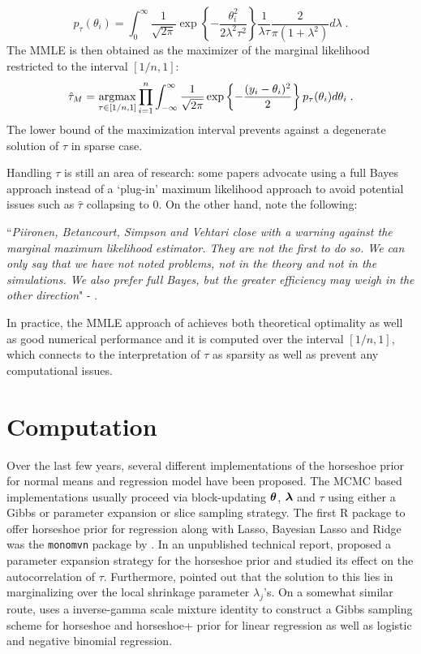 \documentclass[sts,preprint]{imsart}
\begin{document}
\[
p_{\tau}(\theta_i) = \int_{0}^{\infty} \frac{1}{\sqrt{2 \pi}} \exp \left\{ -
  \frac{\theta_i^2}{2\lambda^2 \tau^2} \right\} \frac{1}{\lambda \tau}
  \frac{2}{\pi(1+\lambda^2)} d\lambda
  \;.
\]
The MMLE is then obtained as the maximizer of the marginal likelihood restricted to the interval $[1/n,1]$: 
\[
  \hat{\tau}_M = \argmax_{\tau \in [1/n,1]} \prod_{i=1}^{n}
  \int_{-\infty}^{\infty} \frac{1}{\sqrt{2 \pi}} \exp \left\{ - \frac{(y_i
  -\theta_i)^2}{2} \right\} p_{\tau}(\theta_i) d\theta_i
  \;.
\]
The lower bound of the maximization interval prevents against a degenerate solution of $\tau$ in sparse case. 

Handling $\tau$ is still an area of research: some papers \citep[e.g.]{carvalho2010horseshoe, datta2013asymptotic,piironen2017sparsity} advocate using a full Bayes approach instead of a `plug-in' maximum likelihood approach to avoid potential issues such as $\hat{\tau}$ collapsing to 0. On the other hand, \citet{van2017adaptive} note the following: 

``\textit{Piironen, Betancourt, Simpson and Vehtari close with a warning against the marginal maximum likelihood estimator. They are not the first to do so. We can only say that we have not noted problems, not in the theory and not in the simulations. We also prefer full Bayes, but the greater efficiency may weigh in 
the other direction}" - \citep[\textit{vide} Rejoinder p. 1274]{van2017adaptive}. 


In practice, the MMLE approach of \cite{van2017adaptive} achieves both theoretical optimality as well as good numerical performance and it is computed over the interval $[1/n,1]$, which connects to the interpretation of $\tau$ as sparsity as well as prevent any computational issues. 


\section{Computation}\label{sec:horse-comp}

Over the last few years, several different implementations of the horseshoe prior for normal means and regression model have been proposed. The MCMC based implementations usually proceed via block-updating $\boldsymbol{\theta}$, $\boldsymbol{\lambda}$ and $\tau$ using either a Gibbs or parameter expansion or slice sampling strategy. The first \textsc{R} package to offer horseshoe prior for regression along with Lasso, Bayesian Lasso and Ridge was the \texttt{monomvn} package by \citet{gramacy2010shrinkage}. In an unpublished technical report, \citet{scott_parameter_2010} proposed a parameter expansion strategy for the horseshoe prior and studied its effect on the autocorrelation of $\tau$. Furthermore, \citet{scott_parameter_2010} pointed out that the solution to this lies in marginalizing over the local shrinkage parameter $\lambda_j$'s. On a somewhat similar route, \citet{makalic2016high} uses a inverse-gamma scale mixture identity to construct a Gibbs sampling scheme for horseshoe and horseshoe+ prior for linear regression as well as logistic and negative binomial regression. 
\end{document}
